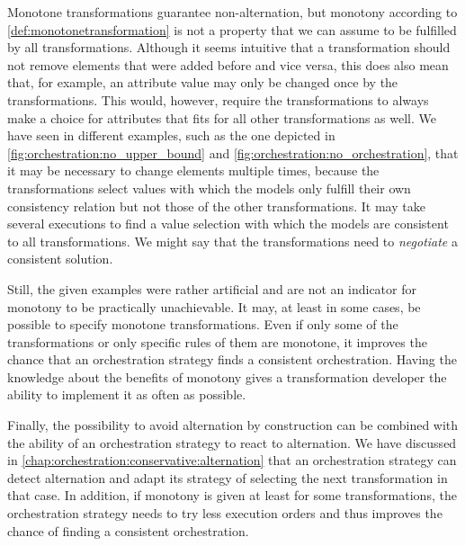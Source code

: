 Monotone transformations guarantee non-alternation, but monotony according to \autoref{def:monotonetransformation} is not a property that we can assume to be fulfilled by all transformations.
Although it seems intuitive that a transformation should not remove elements that were added before and vice versa, this does also mean that, for example, an attribute value may only be changed once by the transformations.
This would, however, require the transformations to always make a choice for attributes that fits for all other transformations as well.
We have seen in different examples, such as the one depicted in \autoref{fig:orchestration:no_upper_bound} and \autoref{fig:orchestration:no_orchestration}, that it may be necessary to change elements multiple times, because the transformations select values with which the models only fulfill their own consistency relation but not those of the other transformations.
It may take several executions to find a value selection with which the models are consistent to all transformations.
We might say that the transformations need to \emph{negotiate} a consistent solution.

Still, the given examples were rather artificial and are not an indicator for monotony to be practically unachievable.
It may, at least in some cases, be possible to specify monotone transformations.
Even if only some of the transformations or only specific rules of them are monotone, it improves the chance that an orchestration strategy finds a consistent orchestration.
Having the knowledge about the benefits of monotony gives a transformation developer the ability to implement it as often as possible.

Finally, the possibility to avoid alternation by construction can be combined with the ability of an orchestration strategy to react to alternation.
We have discussed in \autoref{chap:orchestration:conservative:alternation} that an orchestration strategy can detect alternation and adapt its strategy of selecting the next transformation in that case.
In addition, if monotony is given at least for some transformations, the orchestration strategy needs to try less execution orders and thus improves the chance of finding a consistent orchestration.


